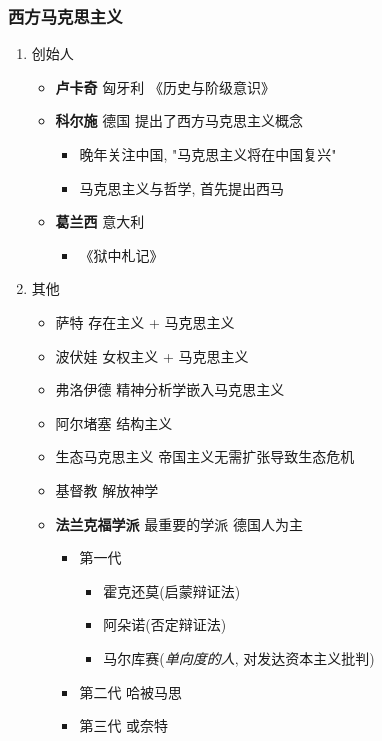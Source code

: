\documentclass[11pt]{article}
\begin{document}
\subsubsection{西方马克思主义}
\label{sec:orgb2df05f}
\begin{enumerate}
\item 创始人
\label{sec:orgfac035c}
\begin{itemize}
\item \textbf{卢卡奇} 匈牙利 《历史与阶级意识》
\item \textbf{科尔施} 德国 提出了西方马克思主义概念
\begin{itemize}
\item 晚年关注中国, "马克思主义将在中国复兴"
\item 马克思主义与哲学, 首先提出西马
\end{itemize}
\item \textbf{葛兰西} 意大利
\begin{itemize}
\item 《狱中札记》
\end{itemize}
\end{itemize}

\item 其他
\label{sec:org3abe932}
\begin{itemize}
\item 萨特 存在主义 + 马克思主义
\item 波伏娃 女权主义 + 马克思主义
\item 弗洛伊德 精神分析学嵌入马克思主义
\item 阿尔堵塞 结构主义
\item 生态马克思主义 帝国主义无需扩张导致生态危机
\item 基督教 解放神学
\item \textbf{\textbf{法兰克福学派}} 最重要的学派 德国人为主
\begin{itemize}
\item 第一代 
\begin{itemize}
\item 霍克还莫(启蒙辩证法)
\item 阿朵诺(否定辩证法)
\item 马尔库赛(\emph{单向度的人}, 对发达资本主义批判)
\end{itemize}
\item 第二代 哈被马思
\item 第三代 或奈特
\end{itemize}
\end{itemize}
\end{enumerate}
\end{document}
